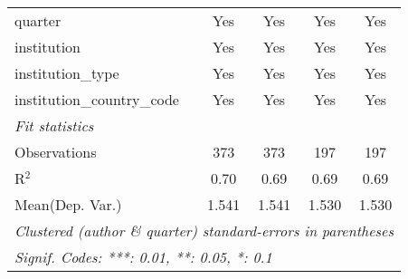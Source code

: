 \begin{tabular}{lcccc}
   quarter                                  & Yes     & Yes     & Yes     & Yes\\  
   institution                              & Yes     & Yes     & Yes     & Yes\\  
   institution\_type                        & Yes     & Yes     & Yes     & Yes\\  
   institution\_country\_code               & Yes     & Yes     & Yes     & Yes\\  
   \midrule
   \emph{Fit statistics}\\
   Observations                             & 373     & 373     & 197     & 197\\  
   R$^2$                                    & 0.70    & 0.69    & 0.69    & 0.69\\  
Mean(Dep. Var.) & 1.541 & 1.541 & 1.530 & 1.530 \\
   \midrule \midrule
   \multicolumn{5}{l}{\emph{Clustered (author \& quarter) standard-errors in parentheses}}\\
   \multicolumn{5}{l}{\emph{Signif. Codes: ***: 0.01, **: 0.05, *: 0.1}}\\
\end{tabular}
\par\endgroup

